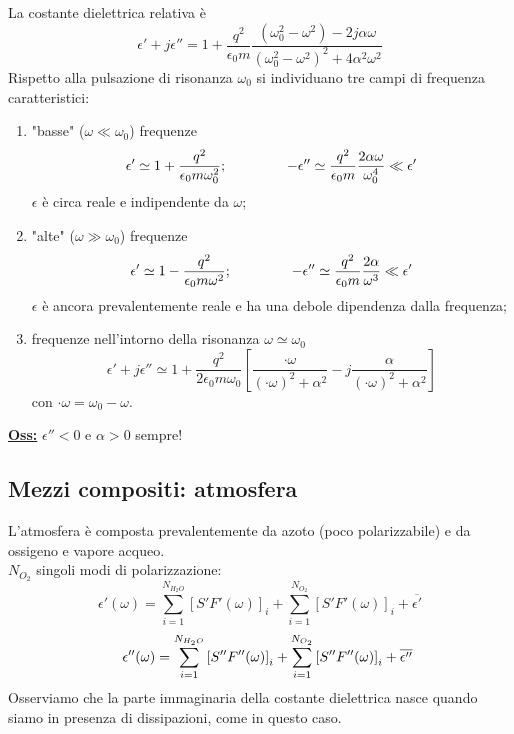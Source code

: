 \documentclass[a4paper]{article}
\begin{document}
La costante dielettrica relativa è
\begin{equation*}
\epsilon'+j\epsilon''=1+\frac{q^2}{\epsilon_0m}\frac{(\omega_0^2-\omega^2)-2j\alpha\omega}{(\omega_0^2-\omega^2)^2+4\alpha^2\omega^2}
\end{equation*}
Rispetto alla pulsazione di risonanza $\omega_0$ si individuano tre campi di frequenza caratteristici:
\begin{enumerate}
\item "basse" ($\omega\ll\omega_0$) frequenze
\begin{equation*}
\epsilon'\simeq1+\frac{q^2}{\epsilon_0m\omega_0^2};\hspace{15mm}-\epsilon''\simeq\frac{q^2}{\epsilon_0m}\frac{2\alpha\omega}{\omega_0^4}\ll\epsilon'
\end{equation*}
$\epsilon$ è circa reale e indipendente da $\omega$;
\item "alte" ($\omega\gg\omega_0$) frequenze
\begin{equation*}
\epsilon'\simeq1-\frac{q^2}{\epsilon_0m\omega^2};\hspace{15mm}-\epsilon''\simeq\frac{q^2}{\epsilon_0m}\frac{2\alpha}{\omega^3}\ll\epsilon'
\end{equation*}
$\epsilon$ è ancora prevalentemente reale e ha una debole dipendenza dalla frequenza;
\item frequenze nell'intorno della risonanza $\omega\simeq\omega_0$
\begin{equation*}
\epsilon'+j\epsilon''\simeq1+\frac{q^2}{2\epsilon_0m\omega_0}\left[\frac{·\omega}{(·\omega)^2+\alpha^2}-j\frac{\alpha}{(·\omega)^2+\alpha^2}\right]
\end{equation*}
con $·\omega=\omega_0-\omega$.\\
\end{enumerate}
\underline{\textbf{Oss:}} $\epsilon''<0$ e $\alpha>0$ sempre!
\subsection*{Mezzi compositi: atmosfera}
L'atmosfera è composta prevalentemente da azoto (poco polarizzabile) e da ossigeno e vapore acqueo.\\
$N_{O_2}$ singoli modi di polarizzazione:
\begin{equation*}
\epsilon'(\omega)=\sum_{i=1}^{N_{H_2O}}\left[S'F'(\omega)\right]_i+\sum_{i=1}^{N_{O_2}}\left[S'F'(\omega)\right]_i+\overline{\epsilon'}
\end{equation*}
\begin{equation*}
\hspace*{4mm}\epsilon''(\omega)=\sum_{i=1}^{N_{H_2O}}\left[S''F''(\omega)\right]_i+\sum_{i=1}^{N_{O_2}}\left[S''F''(\omega)\right]_i+\overline{\epsilon''}
\end{equation*}
Osserviamo che la parte immaginaria della costante dielettrica nasce quando siamo in presenza di dissipazioni, come in questo caso.
\end{document}
